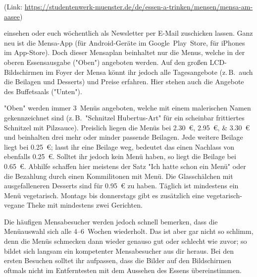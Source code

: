 \begin{multicols*}{2}
(Link: \url{https://studentenwerk-muenster.de/de/essen-a-trinken/mensen/mensa-am-aasee})

einsehen oder euch wöchentlich als Newsletter per E-Mail zuschicken lassen. Ganz neu ist die Mensa-App (für Android-Geräte im Google~Play~Store, für iPhones im App-Store). Doch dieser Mensaplan beinhaltet nur die Menus, welche in der oberen Essensausgabe ("Oben") angeboten werden. Auf den großen LCD-Bildschirmen im Foyer der Mensa könnt ihr jedoch alle Tagesangebote (z.\,B.\ auch die Beilagen und Desserts) und Preise erfahren. Hier stehen auch die Angebote des Buffetsaals ("Unten").

"Oben" werden immer 3~Menüs angeboten, welche mit einem malerischen Namen gekennzeichnet sind (z.\,B.\ "Schnitzel Hubertus-Art" für ein scheinbar frittiertes Schnitzel mit Pilzsauce). Preislich liegen die Menüs bei \SIlist{2,30; 2,95; 3,30}{\euro} und beinhalten drei mehr oder minder passende Beilagen. Jede weitere Beilage liegt bei \SI{0,25}{\euro}; lasst ihr eine Beilage weg, bedeutet das einen Nachlass von ebenfalls \SI{0,25}{\euro}. Solltet ihr jedoch kein Menü haben, so liegt die Beilage bei \SI{0,65}{\euro}. Abhilfe schaffen hier meistens der Satz "Ich hatte schon ein Menü" oder die Bezahlung durch einen Kommilitonen mit Menü. Die Glasschälchen mit ausgefalleneren Desserts sind für \SI{0,95}{\euro} zu haben. Täglich ist mindestens ein Menü vegetarisch. Montags bis donnerstags gibt es zusätzlich eine vegetarisch-vegane Theke mit mindestens zwei Gerichten.

Die häufigen Mensabesucher werden jedoch schnell bemerken, dass die Menüauswahl sich alle 4--6~Wochen wiederholt. Das ist aber gar nicht so schlimm, denn die Menüs schmecken dann wieder genauso gut oder schlecht wie zuvor; so bildet sich langsam ein kompetenter Mensabesucher aus dir heraus. Bei den ersten Besuchen solltet ihr aufpassen, dass die Bilder auf den Bildschirmen oftmals nicht im Entferntesten mit dem Aussehen des Essens übereinstimmen.


\end{multicols*}
